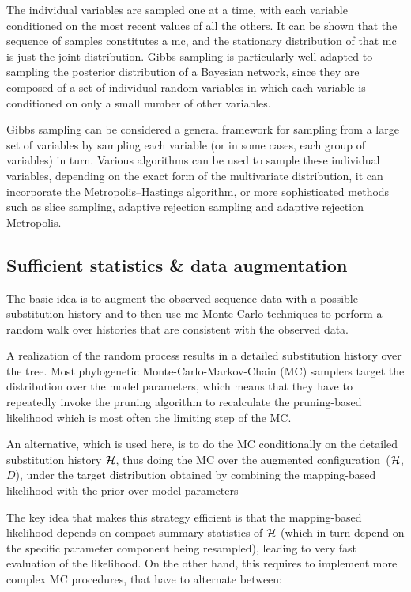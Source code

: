 The individual variables are sampled one at a time, with each variable conditioned on the most recent values of all the others.
It can be shown that the sequence of samples constitutes a \gls{mc}, and the stationary distribution of that \gls{mc} is just the joint distribution.
Gibbs sampling is particularly well-adapted to sampling the \gls{posterior} distribution of a Bayesian network, since they are composed of a set of individual random variables in which each variable is conditioned on only a small number of other variables.

Gibbs sampling can be considered a general framework for sampling from a large set of variables by sampling each variable (or in some cases, each group of variables) in turn.
Various algorithms can be used to sample these individual variables, depending on the exact form of the multivariate distribution, it can incorporate the Metropolis–Hastings algorithm, or more sophisticated methods such as slice sampling, adaptive rejection sampling and adaptive rejection Metropolis.

\subsection{Sufficient statistics \& data augmentation}

The basic idea is to augment the observed sequence data with a possible \gls{substitution} history and to then use \gls{mc} Monte Carlo techniques to perform a random walk over histories that are consistent with the observed data.

A realization of the random process results in a detailed \gls{substitution} history over the tree.
Most phylogenetic Monte-Carlo-Markov-Chain (\acrshort{MC}) samplers target the distribution over the model parameters, which means that they have to repeatedly invoke the pruning algorithm to recalculate
the pruning-based \gls{likelihood} which is most often the limiting step of the \acrshort{MC}.

An alternative, which is used here, is to do the \acrshort{MC} conditionally on the detailed \gls{substitution} history $\mathcal{H}$, thus doing the \acrshort{MC} over the augmented configuration~($\mathcal{H}$, $D$), under the target distribution obtained by combining the mapping-based \gls{likelihood} with the \gls{prior} over model parameters

The key idea that makes this strategy efficient is that the mapping-based \gls{likelihood} depends on
compact summary statistics of $\mathcal{H}$ (which in turn depend on the specific parameter component
being resampled), leading to very fast evaluation of the \gls{likelihood}.
On the other hand, this requires to implement more complex \acrshort{MC} procedures, that have to alternate between:

